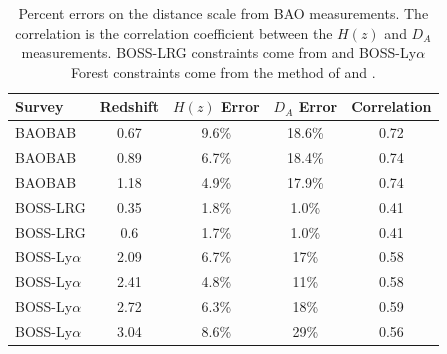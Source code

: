 \documentclass[10pt,iop]{emulateapj}
\begin{document}
\begin{table}[ht]\centering
\caption{Percent errors on the distance scale from BAO measurements.  The correlation is the correlation coefficient between the $H(z)$ and $D_A$ measurements.  BOSS-LRG constraints come from
\citet{schlegel_et_al_2009} and BOSS-Ly$\alpha$ Forest constraints come from the method of
\citet{mcdonald_and_eisenstein_2007} and \citet{dawson_et_al_2012}.}
\begin{tabular}{l|cccc}
Survey & Redshift & $H(z)$ Error & $D_A$ Error & Correlation\\
\hline\hline
BAOBAB & 0.67 & 9.6\% & 18.6\% & 0.72 \\
BAOBAB & 0.89 & 6.7\% & 18.4\% & 0.74 \\
BAOBAB & 1.18 & 4.9\% & 17.9\% & 0.74 \\
\hline
BOSS-LRG & 0.35 & 1.8\% & 1.0\% & 0.41 \\
BOSS-LRG & 0.6 & 1.7\% & 1.0\% & 0.41 \\
\hline
BOSS-Ly$\alpha$ & 2.09 & 6.7\% & 17\% & 0.58 \\
BOSS-Ly$\alpha$ & 2.41 & 4.8\% & 11\% & 0.58 \\
BOSS-Ly$\alpha$ & 2.72 & 6.3\% & 18\% & 0.59 \\
BOSS-Ly$\alpha$ & 3.04 & 8.6\% & 29\% & 0.56 \\
\end{tabular}
\label{tab:constraints}
\end{table}
\end{document}
